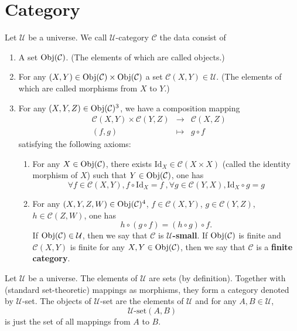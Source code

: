 \section{Category}
\begin{definitionenv}
    Let $\mathcal{U}$ be a universe. We call $\mathcal{U}$-category $\mathcal{C}$ the data consist of
    \begin{enumerate}[label=(\roman*)]
        \item A set $\operatorname{\mathrm{Obj}}(\mathcal{C})$. (The elements of which are called objects.)
        \item For any $(X,Y) \in \operatorname{\mathrm{Obj}}(\mathcal{C})\times \operatorname{\mathrm{Obj}}(\mathcal{C})$ a set $\mathcal{C}(X,Y)\in \mathcal{U}$. (The elements of which are called morphisms from $X$ to $Y$.)
        \item For any $(X,Y,Z)\in \operatorname{\mathrm{Obj}}(\mathcal{C})^3$, we have a composition mapping
$$
            \begin{array}{rcl}
            \mathcal{C}(X,Y)\times \mathcal{C}(Y,Z) &\rightarrow &\mathcal{C}(X,Z)\\ 
            (f,g)&\mapsto & g\circ f
            \end{array}
$$
            satisfying the following axioms:
            \begin{enumerate}[label=(\alph*)]
                \item For any $X\in \operatorname{\mathrm{Obj}}(\mathcal{C})$, there exists $\mathrm{Id}_X\in \mathcal{C}(X\times X)$ (called the identity morphism of $X$) such that $Y\in \operatorname{\mathrm{Obj}}(\mathcal{C})$, one has
                $$\forall f\in \mathcal{C}(X,Y), f\circ \mathrm{Id}_X = f\ ,\forall g\in \mathcal{C}(Y,X), \mathrm{Id}_X\circ g = g$$
                \item For any $(X,Y,Z,W)\in \operatorname{\mathrm{Obj}}(\mathcal{C})^4$, $f\in \mathcal{C}(X,Y)$, $g\in \mathcal{C}(Y,Z)$, $h\in \mathcal{C}(Z,W)$, one has $$ h\circ(g\circ f) = (h\circ g)\circ f.$$
                    If $\operatorname{\mathrm{Obj}}(\mathcal{C})\in \mathcal{U}$, then we say that $\mathcal{C}$ is \textbf{$\mathcal{U}$-small}. If $\operatorname{\mathrm{Obj}}(\mathcal{C})$ is finite and $\mathcal{C}(X,Y)$ is finite for any $X,Y\in \operatorname{\mathrm{Obj}}(\mathcal{C})$, then we say that $\mathcal{C}$ is a \textbf{finite category}.
            \end{enumerate}
    \end{enumerate}
\end{definitionenv}
\begin{exampleenv}
    Let $\mathcal{U}$ be a universe. The elements of $\mathcal{U}$ are sets (by definition). Together with (standard set-theoretic) mappings as morphisms, they form a category denoted by $\mathcal{U}$-set. The objects of $\mathcal{U}$-set are the elements of $\mathcal{U}$ and for any $A,B\in \mathcal{U}$,
    $$ \mathcal{U}\text{-}\mathrm{set}(A,B)$$
    is just the set of all mappings from $A$ to $B$.
\end{exampleenv}
